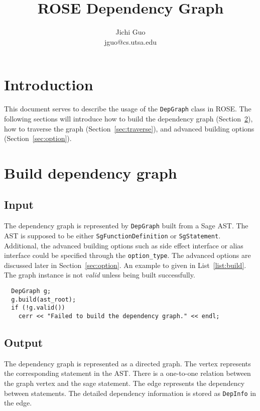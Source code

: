\documentclass[preprint]{llncs}
\title{ROSE Dependency Graph}
\author{Jichi Guo \\ jguo@cs.utsa.edu}
\institute{University of Texas at San Antonio}
\begin{document}
\maketitle

%

%
\section{Introduction}
\label{sec:intro}

This document serves to describe the usage of the \texttt{DepGraph} class in ROSE.
The following sections will introduce
  how to build the dependency graph (Section~\ref{sec:build}),
  how to traverse the graph  (Section~\ref{sec:traverse}),
  and advanced building options (Section~\ref{sec:option}).

%
\section{Build dependency graph}
\label{sec:build}

\subsection{Input}
\label{sec:build:input}
The dependency graph is represented by \texttt{DepGraph} built from a Sage AST.
The AST is supposed to be either \texttt{SgFunctionDefinition} or \texttt{SgStatement}.
Additional, the advanced building options
  such as side effect interface or alias interface
  could be specified through the \texttt{option\_type}.
The advanced options are discussed later in Section~\ref{sec:option}.
An example to given in List~\ref{list:build}.
The graph instance is not \emph{valid} unless being built successfully.

\begin{lstlisting}
  DepGraph g;
  g.build(ast_root);
  if (!g.valid())
    cerr << "Failed to build the dependency graph." << endl;
\end{lstlisting}

\subsection{Output}
\label{sec:build:output}
The dependency graph is represented as a directed graph.
The vertex represents the corresponding statement in the AST.
There is a one-to-one relation between the graph vertex and the sage statement.
The edge represents the dependency between statements.
The detailed dependency information is stored as \texttt{DepInfo} in the edge.
\end{document}
